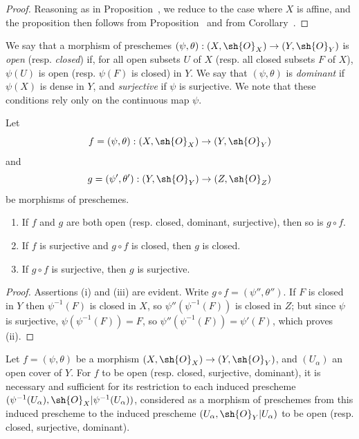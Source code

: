 \begin{proof}
Reasoning as in Proposition~, we reduce to the case where $X$ is affine, and the proposition then follows from Proposition~ and from Corollary~.
\end{proof}

\begin{env}[2.2.6]
\label{I.2.2.6}
We say that a morphism of preschemes $(\psi,\theta):(X,\sh{O}_X)\to(Y,\sh{O}_Y)$ is \emph{open} (resp. \emph{closed}) if, for all open subsets $U$ of $X$ (resp. all closed subsets $F$ of $X$), $\psi(U)$ is open (resp. $\psi(F)$ is closed) in $Y$.
We say that $(\psi,\theta)$ is \emph{dominant} if $\psi(X)$ is dense in $Y$, and \emph{surjective} if $\psi$ is surjective.
We note that these conditions rely only on the continuous map $\psi$.
\end{env}

\begin{proposition}[2.2.7]
\label{I.2.2.7}
Let
\[
  f=(\psi,\theta):(X,\sh{O}_X)\to(Y,\sh{O}_Y)
\]
and
\[
  g=(\psi',\theta'):(Y,\sh{O}_Y)\to(Z,\sh{O}_Z)
\]
be morphisms of preschemes.
\begin{enumerate}
  \item[{\rm(i)}] If $f$ and $g$ are both open (resp. closed, dominant, surjective),
    then so is $g\circ f$.
  \item[{\rm(ii)}] If $f$ is surjective and $g\circ f$ is closed, then $g$ is closed.
  \item[{\rm(iii)}] If $g\circ f$ is surjective, then $g$ is surjective.
\end{enumerate}
\end{proposition}

\begin{proof}
Assertions (i) and (iii) are evident.
Write $g\circ f=(\psi'',\theta'')$.
If $F$ is closed in $Y$ then $\psi^{-1}(F)$ is closed in $X$, so $\psi''(\psi^{-1}(F))$ is closed in $Z$;
but since $\psi$ is surjective, $\psi(\psi^{-1}(F))=F$, so $\psi''(\psi^{-1}(F))=\psi'(F)$, which proves (ii).
\end{proof}

\begin{proposition}[2.2.8]
\label{I.2.2.8}
Let $f=(\psi,\theta)$ be a morphism $(X,\sh{O}_X)\to(Y,\sh{O}_Y)$, and $(U_\alpha)$ an open cover of $Y$.
For $f$ to be open (resp. closed, surjective, dominant), it is necessary and sufficient for its restriction to each induced prescheme $(\psi^{-1}(U_\alpha),\sh{O}_X|\psi^{-1}(U_\alpha))$, considered as a morphism of preschemes from this induced prescheme to the induced prescheme $(U_\alpha,\sh{O}_Y|U_\alpha)$ to be open (resp. closed, surjective, dominant).
\end{proposition}

